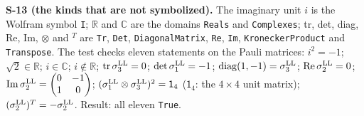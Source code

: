\documentclass[
  10pt,
]{article}
\begin{document}
\textbf{S-13 (the kinds that are not symbolized).} The imaginary unit
\(i\) is the Wolfram symbol \texttt{I}; \(\mathbb R\) and \(\mathbb C\)
are the domains \texttt{Reals} and \texttt{Complexes}; tr, det, diag,
Re, Im, \(\otimes\) and \({}^T\) are \texttt{Tr}, \texttt{Det},
\texttt{DiagonalMatrix}, \texttt{Re}, \texttt{Im},
\texttt{KroneckerProduct} and \texttt{Transpose}. The test checks eleven
statements on the Pauli matrices: \(i^2=-1\); \(\sqrt2\in\mathbb R\);
\(i\in\mathbb C\); \(i\notin\mathbb R\);
\({\rm tr}\,\sigma^{\rm LL}_3=0\); \(\det\sigma^{\rm LL}_1=-1\);
\({\rm diag}(1,-1)=\sigma^{\rm LL}_3\);
\({\rm Re}\,\sigma^{\rm LL}_2=0\);
\({\rm Im}\,\sigma^{\rm LL}_2=\begin{pmatrix}0&-1\\1&0\end{pmatrix}\);
\((\sigma^{\rm LL}_1\otimes\sigma^{\rm LL}_3)^2=\mathsf 1_4\)
(\(\mathsf 1_4\): the \(4\times4\) unit matrix);
\((\sigma^{\rm LL}_2)^T=-\sigma^{\rm LL}_2\). Result: all eleven
\texttt{True}.
\end{document}
